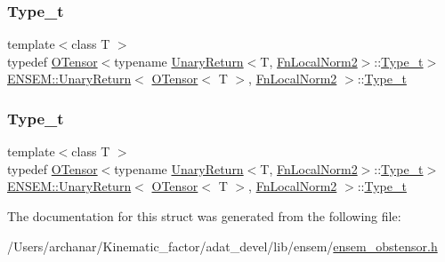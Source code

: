 \subsubsection{\texorpdfstring{Type\_t}{Type\_t}\hspace{0.1cm}{\footnotesize\ttfamily [1/2]}}
{\footnotesize\ttfamily template$<$class T $>$ \\
typedef \mbox{\hyperlink{classENSEM_1_1OTensor}{O\+Tensor}}$<$typename \mbox{\hyperlink{structENSEM_1_1UnaryReturn}{Unary\+Return}}$<$T, \mbox{\hyperlink{structENSEM_1_1FnLocalNorm2}{Fn\+Local\+Norm2}}$>$\+::\mbox{\hyperlink{structENSEM_1_1UnaryReturn_3_01OTensor_3_01T_01_4_00_01FnLocalNorm2_01_4_a6d6f8fdbc603bf32e2db2deaca0b82fa}{Type\+\_\+t}}$>$ \mbox{\hyperlink{structENSEM_1_1UnaryReturn}{E\+N\+S\+E\+M\+::\+Unary\+Return}}$<$ \mbox{\hyperlink{classENSEM_1_1OTensor}{O\+Tensor}}$<$ T $>$, \mbox{\hyperlink{structENSEM_1_1FnLocalNorm2}{Fn\+Local\+Norm2}} $>$\+::\mbox{\hyperlink{structENSEM_1_1UnaryReturn_3_01OTensor_3_01T_01_4_00_01FnLocalNorm2_01_4_a6d6f8fdbc603bf32e2db2deaca0b82fa}{Type\+\_\+t}}}

\mbox{\label{structENSEM_1_1UnaryReturn_3_01OTensor_3_01T_01_4_00_01FnLocalNorm2_01_4_a6d6f8fdbc603bf32e2db2deaca0b82fa}} 
\subsubsection{\texorpdfstring{Type\_t}{Type\_t}\hspace{0.1cm}{\footnotesize\ttfamily [2/2]}}
{\footnotesize\ttfamily template$<$class T $>$ \\
typedef \mbox{\hyperlink{classENSEM_1_1OTensor}{O\+Tensor}}$<$typename \mbox{\hyperlink{structENSEM_1_1UnaryReturn}{Unary\+Return}}$<$T, \mbox{\hyperlink{structENSEM_1_1FnLocalNorm2}{Fn\+Local\+Norm2}}$>$\+::\mbox{\hyperlink{structENSEM_1_1UnaryReturn_3_01OTensor_3_01T_01_4_00_01FnLocalNorm2_01_4_a6d6f8fdbc603bf32e2db2deaca0b82fa}{Type\+\_\+t}}$>$ \mbox{\hyperlink{structENSEM_1_1UnaryReturn}{E\+N\+S\+E\+M\+::\+Unary\+Return}}$<$ \mbox{\hyperlink{classENSEM_1_1OTensor}{O\+Tensor}}$<$ T $>$, \mbox{\hyperlink{structENSEM_1_1FnLocalNorm2}{Fn\+Local\+Norm2}} $>$\+::\mbox{\hyperlink{structENSEM_1_1UnaryReturn_3_01OTensor_3_01T_01_4_00_01FnLocalNorm2_01_4_a6d6f8fdbc603bf32e2db2deaca0b82fa}{Type\+\_\+t}}}



The documentation for this struct was generated from the following file\+:\begin{DoxyCompactItemize}
\item 
/\+Users/archanar/\+Kinematic\+\_\+factor/adat\+\_\+devel/lib/ensem/\mbox{\hyperlink{lib_2ensem_2ensem__obstensor_8h}{ensem\+\_\+obstensor.\+h}}\end{DoxyCompactItemize}
